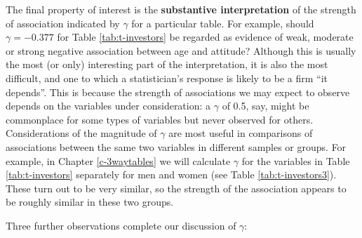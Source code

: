 \documentclass[11pt,a4paper,openany]{book}
\begin{document}
The final property of interest is the \textbf{substantive
interpretation} of the strength of association indicated by \(\gamma\)
for a particular table. For example, should \(\gamma=-0.377\) for Table
\ref{tab:t-investors} be regarded as evidence of weak, moderate or
strong negative association between age and attitude? Although this is
usually the most (or only) interesting part of the interpretation, it is
also the most difficult, and one to which a statistician's response is
likely to be a firm ``it depends''. This is because the strength of
associations we may expect to observe depends on the variables under
consideration: a \(\gamma\) of 0.5, say, might be commonplace for some
types of variables but never observed for others. Considerations of the
magnitude of \(\gamma\) are most useful in comparisons of associations
between the same two variables in different samples or groups. For
example, in Chapter \ref{c-3waytables} we will calculate \(\gamma\) for
the variables in Table \ref{tab:t-investors} separately for men and
women (see Table \ref{tab:t-investors3}). These turn out to be very
similar, so the strength of the association appears to be roughly
similar in these two groups.

Three further observations complete our discussion of \(\gamma\):
\end{document}
